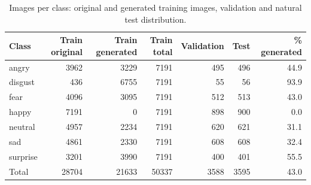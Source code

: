 \begin{table}[ht]
\centering
\small
\caption{Images per class: original and generated training images, validation and natural test distribution.}
\label{tab:data}
\begin{tabular}{lrrrrrr}
\toprule
Class & Train original & Train generated & Train total & Validation & Test & \% generated \\
\midrule
angry & 3962 & 3229 & 7191 & 495 & 496 & 44.9 \\
disgust & 436 & 6755 & 7191 & 55 & 56 & 93.9 \\
fear & 4096 & 3095 & 7191 & 512 & 513 & 43.0 \\
happy & 7191 & 0 & 7191 & 898 & 900 & 0.0 \\
neutral & 4957 & 2234 & 7191 & 620 & 621 & 31.1 \\
sad & 4861 & 2330 & 7191 & 608 & 608 & 32.4 \\
surprise & 3201 & 3990 & 7191 & 400 & 401 & 55.5 \\
Total & 28704 & 21633 & 50337 & 3588 & 3595 & 43.0 \\
\bottomrule
\end{tabular}
\end{table}